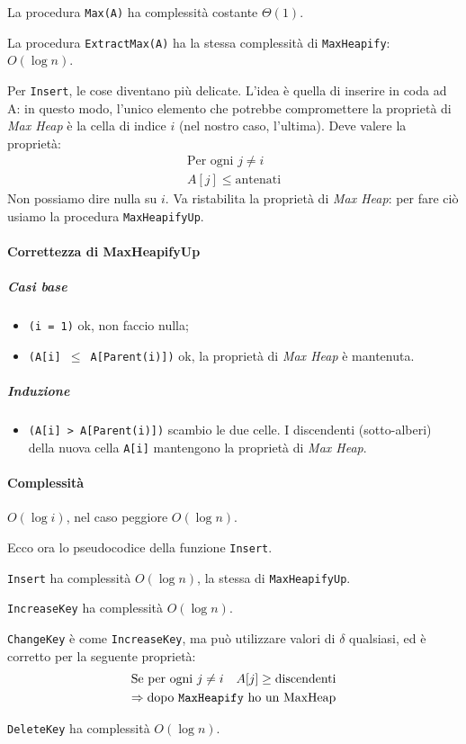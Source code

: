 
La procedura \texttt{Max(A)} ha complessità costante $\Theta (1)$.


La procedura \texttt{ExtractMax(A)} ha la stessa complessità di \texttt{MaxHeapify}: \\
$O(\log n)$.
\bigskip

Per \texttt{Insert}, le cose diventano più delicate. L'idea è quella di inserire
in coda ad A: in questo modo, l'unico elemento che potrebbe compromettere la proprietà di 
\emph{Max Heap} è la cella di indice $i$ (nel nostro caso, l'ultima). Deve valere la proprietà:
\begin{gather*}
	\text{Per ogni } j \neq i \\
	A[j] \leq \text{antenati}
\end{gather*}
Non possiamo dire nulla su $i$. Va ristabilita la proprietà di \emph{Max Heap}: per fare ciò 
usiamo la procedura \texttt{MaxHeapifyUp}.


\paragraph{Correttezza di MaxHeapifyUp}
\subparagraph{Casi base} 
\begin{itemize}
	\item[] \texttt{(i = 1)} ok, non faccio nulla;
	\item[] \texttt{(A[i] $\leq$ A[Parent(i)])} ok, la proprietà di \emph{Max Heap} è mantenuta.
\end{itemize}
\subparagraph{Induzione}
\begin{itemize}
	\item[] \texttt{(A[i] > A[Parent(i)])} scambio le due celle. I discendenti (sotto-alberi) della nuova
	cella \texttt{A[i]} mantengono la proprietà di \emph{Max Heap}.
\end{itemize}

\paragraph{Complessità} $O(\log i)$, nel caso peggiore $O(\log n)$.
\bigskip

Ecco ora lo pseudocodice della funzione \texttt{Insert}.

\texttt{Insert} ha complessità $O(\log n)$, la stessa di \texttt{MaxHeapifyUp}.


\texttt{IncreaseKey} ha complessità $O(\log n)$.

 
\texttt{ChangeKey} è come \texttt{IncreaseKey}, ma può utilizzare valori di $\delta$ qualsiasi, ed è
corretto per la seguente proprietà:
\begin{gather*}
	\text{Se per ogni } j \neq i \quad A[j] \geq \text{discendenti} \\
	\Rightarrow \text{dopo \texttt{MaxHeapify} ho un \emph{MaxHeap}}
\end{gather*}


\texttt{DeleteKey} ha complessità $O(\log n)$.
